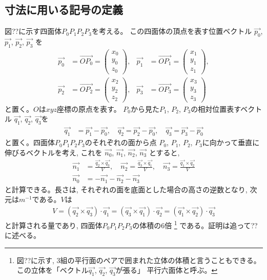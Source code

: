 \subsection{寸法に用いる記号の定義}

図??に示す四面体$P_0P_1P_2P_3$を考える。
この四面体の頂点を表す位置ベクトル
$\vec{p_0}$, $\vec{p_1}$, $\vec{p_2}$, $\vec{p_3}$ を
\begin{align}
\vec{p_0}&=\vec{OP_0}
 =\left(\begin{array}{c}x_0\\y_0\\z_0\end{array}\right),&
\vec{p_1}&=\vec{OP_1}
 =\left(\begin{array}{c}x_1\\y_1\\z_1\end{array}\right),\\
\vec{p_2}&=\vec{OP_2}
 =\left(\begin{array}{c}x_2\\y_2\\z_2\end{array}\right),&
\vec{p_3}&=\vec{OP_3}
 =\left(\begin{array}{c}x_3\\y_3\\z_3\end{array}\right)
\end{align}
と置く。$O$は$xyz$座標の原点を表す。
$P_0$から見た$P_1$, $P_2$, $P_3$の相対位置表すベクトル
$\vec{q_1}$, $\vec{q_2}$, $\vec{q_3}$を
\begin{align}
\vec{q_1}&=\vec{p_1}-\vec{p_0},\quad
\vec{q_2}=\vec{p_2}-\vec{p_0},\quad
\vec{q_3}=\vec{p_3}-\vec{p_0}
\end{align}
と置く。四面体$P_0P_1P_2P_3$のそれぞれの面から点
$P_0$, $P_1$, $P_2$, $P_3$に向かって垂直に伸びるベクトルを考え, これを
$\vec{n_0}$, $\vec{n_1}$, $\vec{n_2}$, $\vec{n_3}$
とすると,
\begin{align}
\vec{n_1}&=\frac{\vec{q_2}\times\vec{q_3}}{V},\quad
\vec{n_2}=\frac{\vec{q_3}\times\vec{q_1}}{V},\quad
\vec{n_3}=\frac{\vec{q_1}\times\vec{q_2}}{V}\\
\vec{n_0}&=-\vec{n_1}-\vec{n_2}-\vec{n_3}
\end{align}
と計算できる。長さは, それぞれの面を底面とした場合の高さの逆数となり,
次元は$m^{-1}$である。$V$は
\begin{align}
V=\left(\vec{q_2}\times\vec{q_3}\right)\cdot\vec{q_1}
 =\left(\vec{q_3}\times\vec{q_1}\right)\cdot\vec{q_2}
 =\left(\vec{q_1}\times\vec{q_2}\right)\cdot\vec{q_3}
\end{align}
と計算される量であり,
四面体$P_0P_1P_2P_3$の体積の6倍
\footnote{図??に示す, 3組の平行面のペアで囲まれた立体の体積と言うこともできる。
この立体を「ベクトル$\vec{q_1}$, $\vec{q_2}$, $\vec{q_3}$が張る」
平行六面体と呼ぶ。}
である。証明は追って??に述べる。

